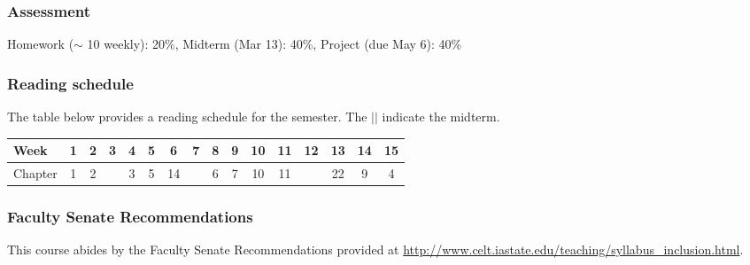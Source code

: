 \documentclass[12pt]{article}
\begin{document}
\subsubsection*{Assessment}

Homework ($\sim$ 10 weekly): 20\%, Midterm (Mar 13): 40\%, Project (due May 6): 40\%

\subsubsection*{Reading schedule}

The table below provides a reading schedule for the semester. The $\vert\vert$ indicate the midterm. 

\vspace{0.2in} 

\begin{tabular}{|l|ccc|cccc|cc||c|ccccc|}
\hline
Week & 1 & 2 & 3 & 4 & 5 & 6 & 7 & 8 & 9 & 10 & 11 & 12 & 13 & 14 & 15 \\
\hline
Chapter & 1 & 2  & & 3 & 5& 14 &  & 6 & 7 &  10 & 11 &  & 22 & 9 & 4 \\
\hline
\end{tabular}

\subsubsection*{Faculty Senate Recommendations}

This course abides by the Faculty Senate Recommendations provided at \url{http://www.celt.iastate.edu/teaching/syllabus_inclusion.html}.
\end{document}
